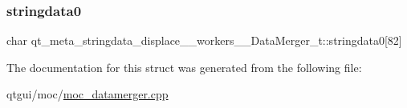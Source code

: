 \subsubsection{\texorpdfstring{stringdata0}{stringdata0}}
{\footnotesize\ttfamily char qt\+\_\+meta\+\_\+stringdata\+\_\+displace\+\_\+\+\_\+workers\+\_\+\+\_\+\+Data\+Merger\+\_\+t\+::stringdata0\mbox{[}82\mbox{]}}



The documentation for this struct was generated from the following file\+:\begin{DoxyCompactItemize}
\item 
qtgui/moc/\mbox{\hyperlink{moc__datamerger_8cpp}{moc\+\_\+datamerger.\+cpp}}\end{DoxyCompactItemize}
